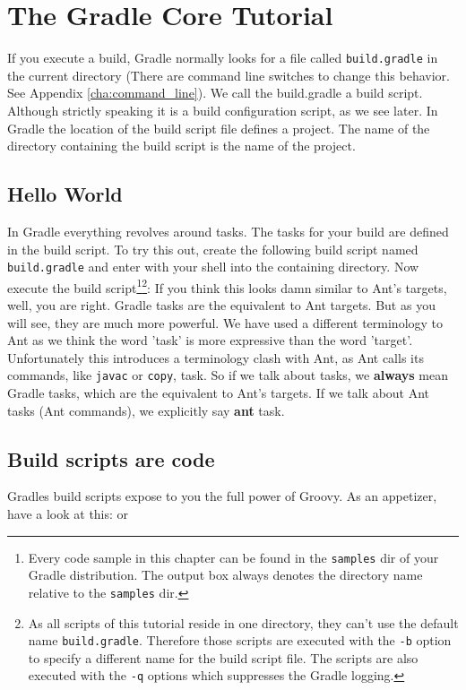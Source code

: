 \chapter{The Gradle Core Tutorial}
\label{cha:gradle_core_tutorial}
If you execute a build, Gradle normally looks for a file called \texttt{build.gradle} in the current directory (There are command line switches to change this behavior. See Appendix \ref{cha:command_line}). We call the build.gradle a build script. Although strictly speaking it is a build configuration script, as we see later. In Gradle the location of the build script file defines a project. The name of the directory containing the build script is the name of the project.  

\section{Hello World}
In Gradle everything revolves around tasks. The tasks for your build are defined in the build script. To try this out, create the following build script named \texttt{build.gradle} and enter with your shell into the containing directory.
Now execute the build script\footnote{Every code sample in this chapter can be found in the \texttt{samples} dir of your Gradle distribution. The output box always denotes the directory name relative to the \texttt{samples} dir.}\footnote{As all scripts of this tutorial reside in one directory, they can't use the default name \texttt{build.gradle}. Therefore those scripts are executed with the \texttt{-b} option to specify a different name for the build script file. The scripts are also executed with the \texttt{-q} options which suppresses the Gradle logging.}:
If you think this looks damn similar to Ant's targets, well, you are right. Gradle tasks are the equivalent to Ant targets. But as you will see, they are much more powerful. We have used a different terminology to Ant as we think the word 'task' is more expressive than the word 'target'. Unfortunately this introduces a terminology clash with Ant, as Ant calls its commands, like \texttt{javac} or \texttt{copy}, task. So if we talk about tasks, we \textbf{always} mean Gradle tasks, which are the equivalent to Ant's targets. If we talk about Ant tasks (Ant commands), we explicitly say \textbf{ant} task.

\section{Build scripts are code}
Gradles build scripts expose to you the full power of Groovy. As an appetizer, have a look at this:
or

